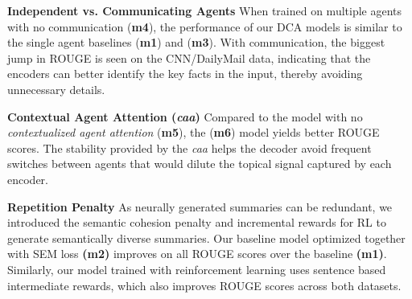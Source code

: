 \documentclass[11pt,a4paper]{article}
\begin{document}
\noindent\textbf{Independent vs. Communicating Agents} When trained on multiple agents with no communication (\textbf{m4}), the performance of our DCA models is similar to the single agent baselines (\textbf{m1}) and (\textbf{m3}). With communication, the biggest jump in ROUGE is seen on the CNN/DailyMail data, indicating that the encoders can better identify the key facts in the input, thereby avoiding unnecessary details. 

\noindent\textbf{Contextual Agent Attention (\textit{caa})} Compared to the model with no \emph{contextualized agent attention} (\textbf{m5}), the (\textbf{m6}) model yields better ROUGE scores. 
The stability provided by the \textit{caa} helps the decoder avoid frequent switches between agents that would dilute the topical signal captured by each encoder.  

\noindent\textbf{Repetition Penalty} As neurally generated summaries can be redundant, we introduced the semantic cohesion penalty and incremental rewards for RL to generate semantically diverse summaries. 
Our baseline model optimized together with SEM loss \textbf{(m2)} improves on all ROUGE scores over the baseline \textbf{(m1)}.   
Similarly, our model trained with reinforcement learning uses sentence based intermediate rewards, which also improves ROUGE scores across both datasets. 
\end{document}
